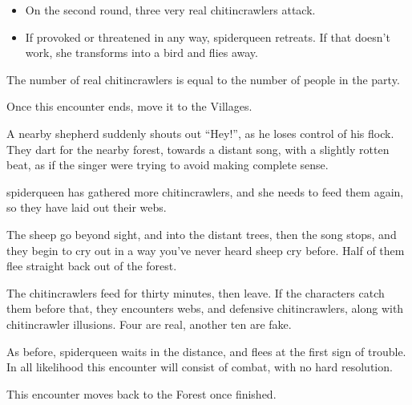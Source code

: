 \begin{multicols}{2}
\begin{itemize}
	\item{On the second round, three very real chitincrawlers attack.}

	\item{If provoked or threatened in any way, \gls{spiderqueen} retreats.  If that doesn't work, she transforms into a bird and flies away.}

\end{itemize}

The number of real chitincrawlers is equal to the number of people in the party.


Once this encounter ends, move it to the Villages.


\begin{boxtext}

	A nearby shepherd suddenly shouts out ``Hey!'', as he loses control of his flock.  They dart for the nearby forest, towards a distant song, with a slightly rotten beat, as if the singer were trying to avoid making complete sense.

\end{boxtext}

\Gls{spiderqueen} has gathered more chitincrawlers, and she needs to feed them again, so they have laid out their webs.

\begin{boxtext}

	The sheep go beyond sight, and into the distant trees, then the song stops, and they begin to cry out in a way you've never heard sheep cry before.  Half of them flee straight back out of the forest.

\end{boxtext}

The chitincrawlers feed for thirty minutes, then leave.  If the characters catch them before that, they encounters webs, and defensive chitincrawlers, along with chitincrawler illusions.  Four are real, another ten are fake.

As before, \gls{spiderqueen} waits in the distance, and flees at the first sign of trouble.  In all likelihood this encounter will consist of combat, with no hard resolution.


This encounter moves back to the Forest once finished.


\end{multicols}
